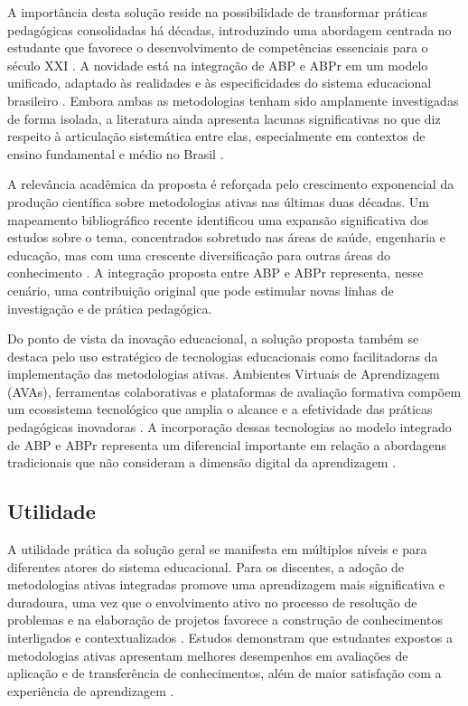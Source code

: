 A importância desta solução reside na possibilidade de transformar práticas pedagógicas consolidadas há décadas, introduzindo uma abordagem centrada no estudante que favorece o desenvolvimento de competências essenciais para o século XXI \cite{BACICH2018}. A novidade está na integração de ABP e ABPr em um modelo unificado, adaptado às realidades e às especificidades do sistema educacional brasileiro \cite{TEODORO2024}. Embora ambas as metodologias tenham sido amplamente investigadas de forma isolada, a literatura ainda apresenta lacunas significativas no que diz respeito à articulação sistemática entre elas, especialmente em contextos de ensino fundamental e médio no Brasil \cite{BARBOSA2013}.

A relevância acadêmica da proposta é reforçada pelo crescimento exponencial da produção científica sobre metodologias ativas nas últimas duas décadas. Um mapeamento bibliográfico recente identificou uma expansão significativa dos estudos sobre o tema, concentrados sobretudo nas áreas de saúde, engenharia e educação, mas com uma crescente diversificação para outras áreas do conhecimento \cite{SANTOS2024}. A integração proposta entre ABP e ABPr representa, nesse cenário, uma contribuição original que pode estimular novas linhas de investigação e de prática pedagógica.

Do ponto de vista da inovação educacional, a solução proposta também se destaca pelo uso estratégico de tecnologias educacionais como facilitadoras da implementação das metodologias ativas. Ambientes Virtuais de Aprendizagem (AVAs), ferramentas colaborativas e plataformas de avaliação formativa compõem um ecossistema tecnológico que amplia o alcance e a efetividade das práticas pedagógicas inovadoras \cite{MEZZARI2011}. A incorporação dessas tecnologias ao modelo integrado de ABP e ABPr representa um diferencial importante em relação a abordagens tradicionais que não consideram a dimensão digital da aprendizagem \cite{SELWYN2022}.

\subsection{Utilidade}
\label{subsec:jg_utilidade}

A utilidade prática da solução geral se manifesta em múltiplos níveis e para diferentes atores do sistema educacional. Para os discentes, a adoção de metodologias ativas integradas promove uma aprendizagem mais significativa e duradoura, uma vez que o envolvimento ativo no processo de resolução de problemas e na elaboração de projetos favorece a construção de conhecimentos interligados e contextualizados \cite{AUSUBEL2000}. Estudos demonstram que estudantes expostos a metodologias ativas apresentam melhores desempenhos em avaliações de aplicação e de transferência de conhecimentos, além de maior satisfação com a experiência de aprendizagem \cite{SOUZA2025}.

